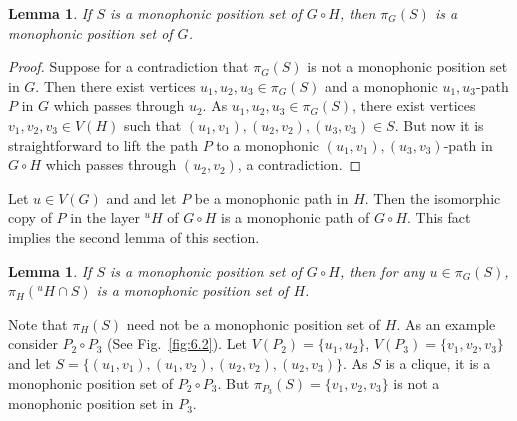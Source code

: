 \documentclass[12pt]{article}
\newtheorem{lemma}[theorem]{Lemma}
\begin{document}
\begin{lemma}
\label{lemma:6.4}
If $S$ is a monophonic position set of $G \circ H$, then $\pi_{G}(S)$ is a monophonic position set of $G$.
\end{lemma}

\begin{proof}
Suppose for a contradiction that $\pi_G (S)$ is not a monophonic position set in $G$. Then there exist vertices $u_1,u_2,u_3 \in \pi_{G}(S)$ and a monophonic  $u_1,u_3$-path $P$ in $G$ which passes through $u_2$. As $u_1,u_2,u_3 \in \pi_{G}(S)$, there exist vertices $v_1,v_2,v_3\in V(H)$ such that $(u_1,v_1), (u_2,v_2), (u_3,v_3)\in S$. But now it is straightforward to lift the path $P$ to a monophonic $(u_1,v_1),(u_3,v_3)$-path in $G\circ H$ which passes through $(u_2,v_2)$, a contradiction. 
\end{proof}

Let $u\in V(G)$ and and let $P$ be a monophonic path in $H$. Then the isomorphic copy of $P$ in the layer $^uH$ of $G\circ H$ is a monophonic path of $G\circ H$. This fact implies the second lemma of this section.   

\begin{lemma}
\label{lem:proj_in_H}
If $S$ is a monophonic position set of $G\circ H$, then for any $u\in \pi_{G}(S)$, $\pi_{H}({}^uH\cap S)$ is a monophonic position set of $H$.
\end{lemma}

Note that $\pi_{H}(S)$ need not be a monophonic position set of $H$. As an example consider $P_2\circ P_3$ (See Fig.~\ref{fig:6.2}). Let $V(P_2)=\{u_1,u_2\}$, $V(P_3)=\{v_1,v_2,v_3\}$ and let $S=\{(u_1,v_1),(u_1,v_2),(u_2,v_2),(u_2,v_3)\}$. As $S$ is a clique, it is a monophonic position set of $P_2\circ P_3$. But $\pi_{P_3}(S)=\{v_1,v_2,v_3\}$ is not a monophonic position set in $P_3$.\\ \\
\end{document}
